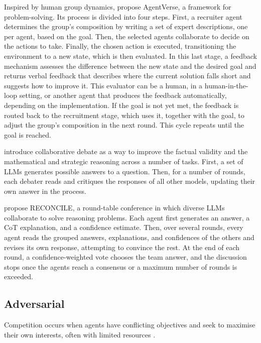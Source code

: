 Inspired by human group dynamics, \textcite{chen2023agentversefacilitatingmultiagentcollaboration} propose AgentVerse, a framework for problem-solving. Its process is divided into four steps. First, a recruiter agent determines the group's composition by writing a set of expert descriptions, one per agent, based on the goal. Then, the selected agents collaborate to decide on the actions to take. Finally, the chosen action is executed, transitioning the environment to a new state, which is then evaluated. In this last stage, a feedback mechanism assesses the difference between the new state and the desired goal and returns verbal feedback that describes where the current solution falls short and suggests how to improve it. This evaluator can be a human, in a human-in-the-loop setting, or another agent that produces the feedback automatically, depending on the implementation. If the goal is not yet met, the feedback is routed back to the recruitment stage, which uses it, together with the goal, to adjust the group's composition in the next round. This cycle repeats until the goal is reached.

\textcite{3692070.3692537} introduce collaborative debate as a way to improve the factual validity and the mathematical and strategic reasoning across a number of tasks. First, a set of LLMs generates possible answers to a question. Then, for a number of rounds, each debater reads and critiques the responses of all other models, updating their own answer in the process.

\textcite{chen2024reconcileroundtableconferenceimproves} propose RECONCILE, a round-table conference in which diverse \acp{LLM} collaborate to solve reasoning problems. Each agent first generates an answer, a \ac{CoT} explanation, and a confidence estimate. Then, over several rounds, every agent reads the grouped answers, explanations, and confidences of the others and revises its own response, attempting to convince the rest. At the end of each round, a confidence-weighted vote chooses the team answer, and the discussion stops once the agents reach a consensus or a maximum number of rounds is exceeded. 

\subsection{Adversarial}
Competition occurs when agents have conflicting objectives and seek to maximise their own interests, often with limited resources \parencite{tran2025multiagentcollaborationmechanismssurvey}.

